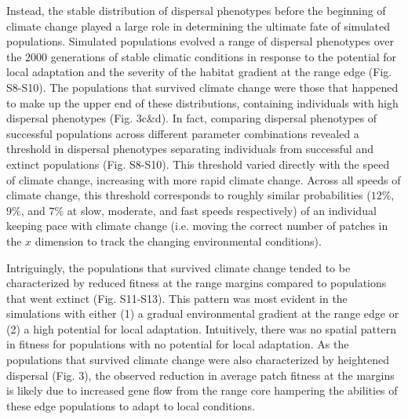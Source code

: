 \documentclass[12pt, oneside]{article}
\begin{document}
Instead, the stable distribution of dispersal phenotypes before the beginning of climate change played a large role in determining the ultimate fate of simulated populations. Simulated populations evolved a range of dispersal phenotypes over the $2000$ generations of stable climatic conditions in response to the potential for local adaptation and the severity of the habitat gradient at the range edge (Fig. S8-S10). The populations that survived climate change were those that happened to make up the upper end of these distributions, containing individuals with high dispersal phenotypes (Fig. 3c\&d). In fact, comparing dispersal phenotypes of successful populations across different parameter combinations revealed a threshold in dispersal phenotypes separating individuals from successful and extinct populations (Fig. S8-S10). This threshold varied directly with the speed of climate change, increasing with more rapid climate change. Across all speeds of climate change, this threshold corresponds to roughly similar probabilities ($12\%$, $9\%$, and $7\%$ at slow, moderate, and fast speeds respectively) of an individual keeping pace with climate change (i.e. moving the correct number of patches in the $x$ dimension to track the changing environmental conditions).

Intriguingly, the populations that survived climate change tended to be characterized by reduced fitness at the range margins compared to populations that went extinct (Fig. S11-S13). This pattern was most evident in the simulations with either (1) a gradual environmental gradient at the range edge or (2) a high potential for local adaptation. Intuitively, there was no spatial pattern in fitness for populations with no potential for local adaptation. As the populations that survived climate change were also characterized by heightened dispersal (Fig. 3), the observed reduction in average patch fitness at the margins is likely due to increased gene flow from the range core hampering the abilities of these edge populations to adapt to local conditions.
\end{document}

